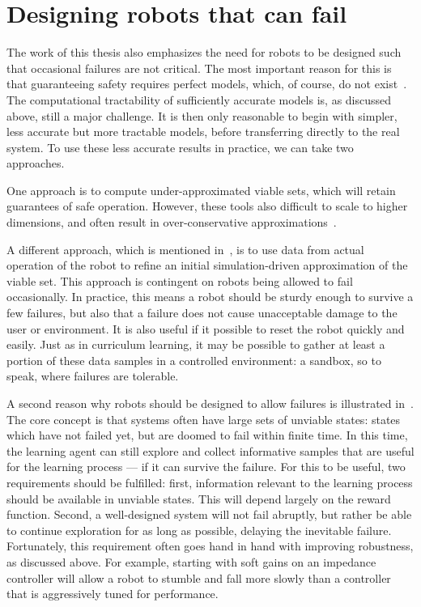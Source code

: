 \section{Designing robots that can fail}
The work of this thesis also emphasizes the need for robots to be designed such that occasional failures are not critical. The most important reason for this is that guaranteeing safety requires perfect models, which, of course, do not exist~\cite{box1976science}. The computational tractability of sufficiently accurate models is, as discussed above, still a major challenge. It is then only reasonable to begin with simpler, less accurate but more tractable models, before transferring directly to the real system. To use these less accurate results in practice, we can take two approaches. \par
One approach is to compute under-approximated viable sets, which will retain guarantees of safe operation. However, these tools also difficult to scale to higher dimensions, and often result in over-conservative approximations~\cite{manchester2011regions}. \par
A different approach, which is mentioned in~\cite{heim2019learnable}, is to use data from actual operation of the robot to refine an initial simulation-driven approximation of the viable set. This approach is contingent on robots being allowed to fail occasionally. In practice, this means a robot should be sturdy enough to survive a few failures, but also that a failure does not cause unacceptable damage to the user or environment. It is also useful if it possible to reset the robot quickly and easily. Just as in curriculum learning, it may be possible to gather at least a portion of these data samples in a controlled environment: a sandbox, so to speak, where failures are tolerable. \par

A second reason why robots should be designed to allow failures is illustrated in~\cite{heim2018unviable}. The core concept is that systems often have large sets of unviable states: states which have not failed yet, but are doomed to fail within finite time. In this time, the learning agent can still explore and collect informative samples that are useful for the learning process --- if it can survive the failure. For this to be useful, two requirements should be fulfilled: first, information relevant to the learning process should be available in unviable states. This will depend largely on the reward function. Second, a well-designed system will not fail abruptly, but rather be able to continue exploration for as long as possible, delaying the inevitable failure. Fortunately, this requirement often goes hand in hand with improving robustness, as discussed above. For example, starting with soft gains on an impedance controller will allow a robot to stumble and fall more slowly than a controller that is aggressively tuned for performance.

